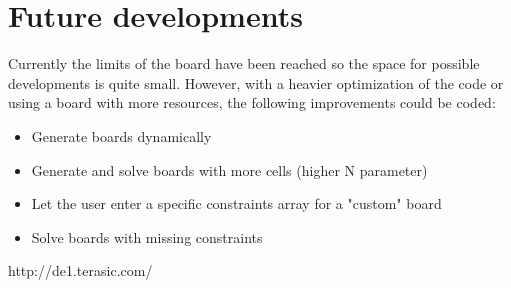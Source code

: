 \documentclass[12pt]{report}
\begin{document}
\section*{Future developments}

Currently the limits of the board have been reached so the space for
possible developments is quite small. However, with a heavier optimization
of the code or using a board with more resources, the following improvements
could be coded:

\begin{itemize}

    \item Generate boards dynamically
    \item Generate and solve boards with more cells (higher N parameter)
    \item Let the user enter a specific constraints array for a "custom" board
    \item Solve boards with missing constraints

\end{itemize}

\renewcommand{\bibname}{References}
\begin{thebibliography}{100}

 http://de1.terasic.com/

\end{thebibliography}
\end{document}
